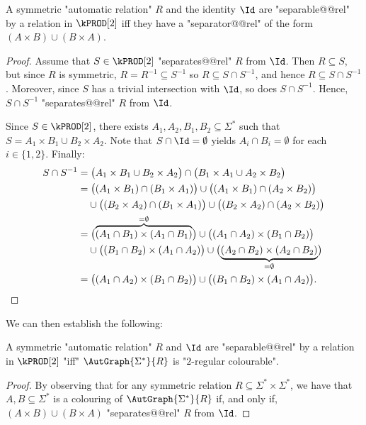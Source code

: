 \begin{lemma}
    A symmetric "automatic relation" $R$ and the identity $\Id$ are "separable@@rel" by a relation in $\kPROD[2]$ iff they have a "separator@@rel" of the form $(A \times B) \cup (B \times A)$.
\end{lemma}
\begin{proof}
    Assume that $S \in \kPROD[2]$ "separates@@rel" $R$ from $\Id$.
    Then $R \subseteq S$, but since $R$ is symmetric, $R = R^{-1} \subseteq S^{-1}$ so
    $R \subseteq S \cap S^{-1}$, and hence $R \subseteq S \cap S^{-1}$.
    Moreover, since $S$ has a trivial intersection with $\Id$, so does $S \cap S^{-1}$.
    Hence, $S \cap S^{-1}$ "separates@@rel" $R$ from $\Id$.

    Since $S \in \kPROD[2]$, there exists $A_1,A_2,B_1,B_2 \subseteq \Sigma^*$ such that
    $S = A_1 \times B_1 \cup B_2 \times A_2$.
    Note that $S \cap \Id = \emptyset$ yields $A_i \cap B_i = \emptyset$ for each $i \in \{1,2\}$.
    Finally:
    \begin{align*}
        S \cap S^{-1} &
        =
            \bigl( A_1 \times B_1 \cup B_2 \times A_2 \bigr)
            \cap \bigl( B_1 \times A_1 \cup A_2 \times B_2 \bigr) \\
        &
        =
            \bigl( (A_1 \times B_1) \cap (B_1 \times A_1) \bigr)
            \cup \bigl( (A_1 \times B_1) \cap (A_2 \times B_2) \bigr) \\
        &
        \hphantom{=\;} \cup \bigl( (B_2 \times A_2) \cap (B_1 \times A_1) \bigr)
            \cup \bigl( (B_2 \times A_2) \cap (A_2 \times B_2) \bigr) \\
        &
        =
            \bigl( \overbrace{(A_1 \cap B_1) \times (A_1 \cap B_1)}^{= \emptyset} \bigr)
            \cup \bigl( (A_1 \cap A_2) \times (B_1 \cap B_2) \bigr) \\
        &
        \hphantom{=\;} \cup \bigl( (B_1 \cap B_2) \times (A_1 \cap A_2) \bigr)
            \cup \bigl( \underbrace{(A_2 \cap B_2) \times (A_2 \cap B_2)}_{= \emptyset} \bigr)\\
        &
        = \bigl( (A_1 \cap A_2) \times (B_1 \cap B_2) \bigr)
            \cup \bigl( (B_1 \cap B_2) \times (A_1 \cap A_2) \bigr).\qedhere
    \end{align*}
\end{proof}

We can then establish the following: 

\begin{corollary}\AP\label{cor:2reg-2prod}
    A symmetric "automatic relation" $R$ and $\Id$ are "separable@@rel" by a relation in $\kPROD[2]$ "iff" $\AutGraph{\Sigma^*}{R}$ is "$2$-regular colourable".
\end{corollary}
\begin{proof}
    By observing that for any symmetric relation $R \subseteq \Sigma^* \times \Sigma^*$, we have that $A,B \subseteq \Sigma^*$ is a colouring of $\AutGraph{\Sigma^*}{R}$ if, and only if, $(A \times B) \cup (B \times A)$ "separates@@rel" $R$ from $\Id$.
\end{proof}

